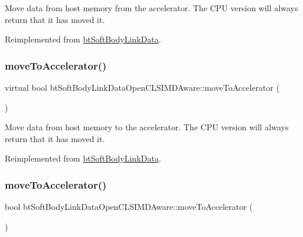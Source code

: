 Move data from host memory from the accelerator. The C\+PU version will always return that it has moved it. 

Reimplemented from \hyperlink{classbtSoftBodyLinkData_a5018ad236aae590df94bca63c1ad7ee1}{bt\+Soft\+Body\+Link\+Data}.

\mbox{\label{classbtSoftBodyLinkDataOpenCLSIMDAware_ac76fd4a1a8b28a48e283050efc14a096}} 
\subsubsection{\texorpdfstring{move\+To\+Accelerator()}{moveToAccelerator()}\hspace{0.1cm}{\footnotesize\ttfamily [1/2]}}
{\footnotesize\ttfamily virtual bool bt\+Soft\+Body\+Link\+Data\+Open\+C\+L\+S\+I\+M\+D\+Aware\+::move\+To\+Accelerator (\begin{DoxyParamCaption}{ }\end{DoxyParamCaption})\hspace{0.3cm}{\ttfamily [virtual]}}

Move data from host memory to the accelerator. The C\+PU version will always return that it has moved it. 

Reimplemented from \hyperlink{classbtSoftBodyLinkData_a6cce268f804d465f3bc998771d3a7433}{bt\+Soft\+Body\+Link\+Data}.

\mbox{\label{classbtSoftBodyLinkDataOpenCLSIMDAware_a37ded0994aded2026babb6c35838af75}} 
\subsubsection{\texorpdfstring{move\+To\+Accelerator()}{moveToAccelerator()}\hspace{0.1cm}{\footnotesize\ttfamily [2/2]}}
{\footnotesize\ttfamily bool bt\+Soft\+Body\+Link\+Data\+Open\+C\+L\+S\+I\+M\+D\+Aware\+::move\+To\+Accelerator (\begin{DoxyParamCaption}{ }\end{DoxyParamCaption})\hspace{0.3cm}{\ttfamily [virtual]}}

